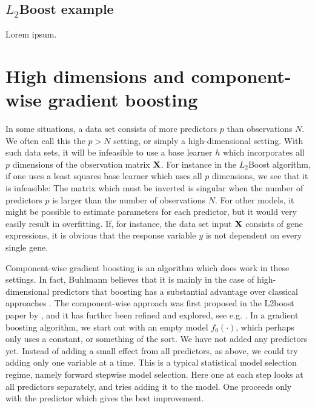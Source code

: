 \subsection{$L_2$Boost example}
Lorem ipsum.

\section{High dimensions and component-wise gradient boosting}
In some situations, a data set consists of more predictors $p$ than observations $N$. We often call this the $p>N$ setting, or simply a high-dimensional setting. With such data sets, it will be infeasible to use a base learner $h$ which incorporates all $p$ dimensions of the observation matrix $\mathbf{X}$.
For instance in the $L_2$Boost algorithm, if one uses a least squares base learner which uses all $p$ dimensions, we see that it is infeasible: The matrix which must be inverted is singular when the number of predictors $p$ is larger than the number of observations $N$. For other models, it might be possible to estimate parameters for each predictor, but it would very easily result in overfitting. If, for instance, the data set input $\mathbf{X}$ consists of gene expressions, it is obvious that the response variable $y$ is not dependent on every single gene.

Component-wise gradient boosting is an algorithm which does work in these settings. In fact, Buhlmann believes that it is mainly in the case of high-dimensional predictors that boosting has a substantial advantage over classical approaches \citep{buhlmann2006}.
The component-wise approach was first proposed in the L2boost paper by \citet{buhlmann-yu}, and it has further been refined and explored, see e.g. \citet{buhlmann2006}.
In a gradient boosting algorithm, we start out with an empty model $f_0(\cdot)$, which perhaps only uses a constant, or something of the sort. We have not added any predictors yet. Instead of adding a small effect from all predictors, as above, we could try adding only one variable at a time. This is a typical statistical model selection regime, namely forward stepwise model selection. Here one at each step looks at all predictors separately, and tries adding it to the model. One proceeds only with the predictor which gives the best improvement.

